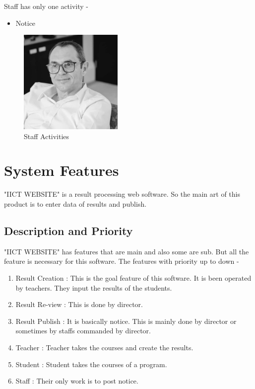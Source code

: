 \documentclass{scrreprt}
\begin{document}
\newline
Staff has only one activity - 
\begin{itemize}
    \item Notice
\end{itemize} 
\begin{figure}[h!]
    \centering
    \includegraphics[width=5cm]{ricardo.jpg}
    \caption{Staff Activities}
    \label{fig:Staff Activities}
\end{figure}

\chapter{System Features}
"IICT WEBSITE" is a result processing web software. So the main art of this product is to enter data of results and publish. 

\section{Description and Priority}
"IICT WEBSITE" has features that are main and also some are sub. But all the feature is necessary for this software.
\newline
The features with priority up to down - 
\begin{enumerate}
    \item Result Creation : This is the goal feature of this software. It is been operated by teachers. They input the results of the students.
    \item Result Re-view : This is done by director.
    \item Result Publish : It is basically notice. This is mainly done by director or sometimes by staffs commanded by director.
    \item Teacher : Teacher takes the courses and create the results.
    \item Student : Student takes the courses of a program.
    \item Staff : Their only work is to post notice.
\end{enumerate}
\end{document}
